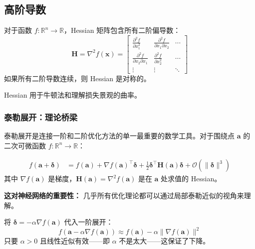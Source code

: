 \subsection{高阶导数}

\begin{定义}[Hessian 矩阵]
对于函数 $f: \mathbb{R}^n \to \mathbb{R}$，Hessian 矩阵包含所有二阶偏导数：
\begin{equation}
\mathbf{H} = \nabla^2 f(\mathbf{x}) = \begin{bmatrix}
\frac{\partial^2 f}{\partial x_1^2} & \frac{\partial^2 f}{\partial x_1 \partial x_2} & \cdots \\
\frac{\partial^2 f}{\partial x_2 \partial x_1} & \frac{\partial^2 f}{\partial x_2^2} & \cdots \\
\vdots & \vdots & \ddots
\end{bmatrix}
\end{equation}
如果所有二阶导数连续，则 Hessian 是对称的。
\end{定义}

Hessian 用于牛顿法和理解损失景观的曲率。

\subsubsection{泰勒展开：理论桥梁}

泰勒展开是连接一阶和二阶优化方法的单一最重要的数学工具。对于围绕点 $\mathbf{a}$ 的二次可微函数 $f: \mathbb{R}^n \to \mathbb{R}$：

\begin{定义}[多元泰勒展开]
\begin{align}
f(\mathbf{a} + \boldsymbol{\delta}) &= f(\mathbf{a}) + \nabla f(\mathbf{a})^\top \boldsymbol{\delta} + \frac{1}{2}\boldsymbol{\delta}^\top \mathbf{H}(\mathbf{a})\boldsymbol{\delta} + \mathcal{O}(\|\boldsymbol{\delta}\|^3)
\end{align}
其中 $\nabla f(\mathbf{a})$ 是梯度，$\mathbf{H}(\mathbf{a}) = \nabla^2 f(\mathbf{a})$ 是在 $\mathbf{a}$ 处求值的 Hessian。
\end{定义}

\textbf{这对神经网络的重要性：} 几乎所有优化理论都可以通过局部泰勒近似的视角来理解。

\begin{示例}[梯度下降作为一阶泰勒近似]
将 $\boldsymbol{\delta} = -\alpha \nabla f(\mathbf{a})$ 代入一阶展开：
\begin{equation}
f(\mathbf{a} - \alpha \nabla f(\mathbf{a})) \approx f(\mathbf{a}) - \alpha \|\nabla f(\mathbf{a})\|^2
\end{equation}
只要 $\alpha > 0$ 且线性近似有效——即 $\alpha$ 不是太大——这保证了下降。
\end{示例}

